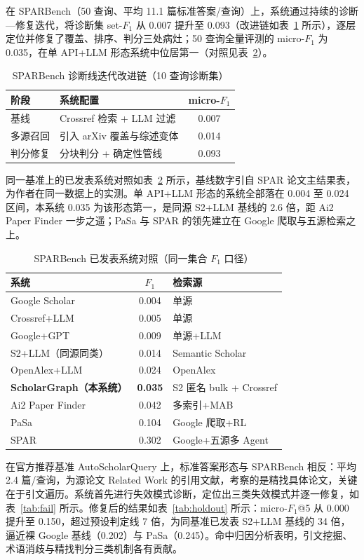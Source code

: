 \documentclass[12pt,a4paper]{ctexart}
\begin{document}
在 SPARBench\cite{sparbench}（50 查询、平均 11.1 篇标准答案/查询）上，系统通过持续的诊断—修复迭代，将诊断集 set-$F_1$ 从 0.007 提升至 0.093（改进链如表~\ref{tab:diag} 所示），逐层定位并修复了覆盖、排序、判分三处病灶；50 查询全量评测的 micro-$F_1$ 为 0.035，在单 API+LLM 形态系统中位居第一（对照见表~\ref{tab:sparbench}）。

\begin{table}[htbp]
\centering
\small
\caption{SPARBench 诊断线迭代改进链（10 查询诊断集）}
\label{tab:diag}
\begin{tabularx}{\textwidth}{l X c}
\toprule
阶段 & 系统配置 & micro-$F_1$ \tabularnewline
\midrule
基线 & Crossref 检索 + LLM 过滤 & 0.007 \tabularnewline
多源召回 & 引入 arXiv 覆盖与综述变体 & 0.014 \tabularnewline
判分修复 & 分块判分 + 确定性管线 & 0.093 \tabularnewline
\bottomrule
\end{tabularx}
\end{table}

同一基准上的已发表系统对照如表~\ref{tab:sparbench} 所示，基线数字引自 SPAR 论文主结果表，为作者在同一数据上的实测。单 API+LLM 形态的系统全部落在 0.004 至 0.024 区间，本系统 0.035 为该形态第一，是同源 S2+LLM 基线的 2.6 倍，距 Ai2 Paper Finder 一步之遥；PaSa 与 SPAR 的领先建立在 Google 爬取与五源检索之上。

\begin{table}[htbp]
\centering
\small
\caption{SPARBench 已发表系统对照（同一集合 $F_1$ 口径）}
\label{tab:sparbench}
\begin{tabularx}{\textwidth}{X c X}
\toprule
系统 & $F_1$ & 检索源 \tabularnewline
\midrule
Google Scholar & 0.004 & 单源 \tabularnewline
Crossref+LLM & 0.005 & 单源 \tabularnewline
Google+GPT & 0.009 & 单源+LLM \tabularnewline
S2+LLM（同源同类） & 0.014 & Semantic Scholar \tabularnewline
OpenAlex+LLM & 0.024 & OpenAlex \tabularnewline
\textbf{ScholarGraph（本系统）} & \textbf{0.035} & S2 匿名 bulk + Crossref \tabularnewline
Ai2 Paper Finder & 0.042 & 多索引+MAB \tabularnewline
PaSa & 0.104 & Google 爬取+RL \tabularnewline
SPAR & 0.302 & Google+五源多 Agent \tabularnewline
\bottomrule
\end{tabularx}
\end{table}

在官方推荐基准 AutoScholarQuery 上，标准答案形态与 SPARBench 相反：平均 2.4 篇/查询，为源论文 Related Work 的引用文献，考察的是精找具体论文，关键在于引文遍历。系统首先进行失效模式诊断，定位出三类失效模式并逐一修复，如表~\ref{tab:fail} 所示。修复后的结果如表~\ref{tab:holdout} 所示：micro-$F_1$@5 从 0.000 提升至 0.150，超过预设判定线 7 倍，为同基准已发表 S2+LLM 基线的 34 倍，逼近裸 Google 基线（0.202）与 PaSa（0.245）。命中归因分析表明，引文挖掘、术语消歧与精找判分三类机制各有贡献。
\end{document}
